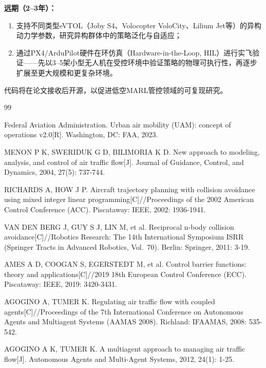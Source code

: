\documentclass[12pt,a4paper,UTF8]{ctexart}
\begin{document}
\textbf{远期（2--3年）：}
\begin{enumerate}[label=(\arabic*), resume]
    \item 支持不同类型eVTOL（Joby S4、Volocopter VoloCity、Lilium Jet等）的异构动力学参数，研究异构群体中的策略泛化与自适应；
    \item 通过PX4/ArduPilot硬件在环仿真（Hardware-in-the-Loop, HIL）进行实飞验证——先以3--5架小型无人机在受控环境中验证策略的物理可执行性，再逐步扩展至更大规模和更复杂环境。
\end{enumerate}

代码将在论文接收后开源，以促进低空MARL管控领域的可复现研究。

\begin{thebibliography}{99}

 Federal Aviation Administration. Urban air mobility (UAM): concept of operations v2.0[R]. Washington, DC: FAA, 2023.

 MENON P K, SWERIDUK G D, BILIMORIA K D. New approach to modeling, analysis, and control of air traffic flow[J]. Journal of Guidance, Control, and Dynamics, 2004, 27(5): 737-744.

 RICHARDS A, HOW J P. Aircraft trajectory planning with collision avoidance using mixed integer linear programming[C]//Proceedings of the 2002 American Control Conference (ACC). Piscataway: IEEE, 2002: 1936-1941.

 VAN DEN BERG J, GUY S J, LIN M, et al. Reciprocal n-body collision avoidance[C]//Robotics Research: The 14th International Symposium ISRR (Springer Tracts in Advanced Robotics, Vol.\ 70). Berlin: Springer, 2011: 3-19.

 AMES A D, COOGAN S, EGERSTEDT M, et al. Control barrier functions: theory and applications[C]//2019 18th European Control Conference (ECC). Piscataway: IEEE, 2019: 3420-3431.

 AGOGINO A, TUMER K. Regulating air traffic flow with coupled agents[C]//Proceedings of the 7th International Conference on Autonomous Agents and Multiagent Systems (AAMAS 2008). Richland: IFAAMAS, 2008: 535-542.

 AGOGINO A K, TUMER K. A multiagent approach to managing air traffic flow[J]. Autonomous Agents and Multi-Agent Systems, 2012, 24(1): 1-25.


\end{thebibliography}
\end{document}
